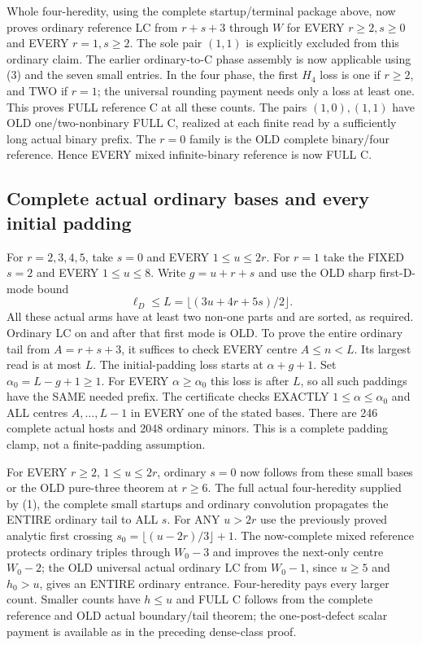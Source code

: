 Whole four-heredity, using the complete startup/terminal package
above, now proves ordinary reference LC from $r+s+3$ through
$W$ for EVERY $r\ge2,s\ge0$ and EVERY $r=1,s\ge2$.
The sole pair $(1,1)$ is explicitly excluded from this ordinary
claim. The earlier ordinary-to-C phase assembly is now applicable
using (3) and the seven small entries. In the four phase, the
first $H_4$ loss is one if $r\ge2$, and TWO if $r=1$;
the universal rounding payment needs only a loss at least one.
This proves FULL reference C at all these counts. The pairs
$(1,0),(1,1)$ have OLD one/two-nonbinary FULL C, realized at
each finite read by a sufficiently long actual binary prefix.
The $r=0$ family is the OLD complete binary/four reference.
Hence EVERY mixed infinite-binary reference is now FULL C.

\subsection{Complete actual ordinary bases and every initial padding}
For $r=2,3,4,5$, take $s=0$ and EVERY $1\le u\le2r$.
For $r=1$ take the FIXED $s=2$ and EVERY $1\le u\le8$.
Write $g=u+r+s$ and use the OLD sharp first-D-mode bound
\[
          \ell_D\le L=\lfloor(3u+4r+5s)/2\rfloor .
\]
All these actual arms have at least two non-one parts and are
sorted, as required. Ordinary LC on and after that first mode
is OLD. To prove the entire ordinary tail from $A=r+s+3$, it
suffices to check EVERY centre $A\le n<L$.
Its largest read is at most $L$.
The initial-padding loss starts at $\alpha+g+1$. Set
$\alpha_0=L-g+1\ge1$. For EVERY $\alpha\ge\alpha_0$ this
loss is after $L$, so all such paddings have the SAME needed prefix.
The certificate checks EXACTLY $1\le\alpha\le\alpha_0$ and
ALL centres $A,\ldots,L-1$ in EVERY one of the stated bases.
There are 246 complete actual hosts and 2048 ordinary minors.
This is a complete padding clamp, not a finite-padding assumption.

For EVERY $r\ge2$, $1\le u\le2r$, ordinary $s=0$ now follows
from these small bases or the OLD pure-three theorem at $r\ge6$.
The full actual four-heredity supplied by (1), the complete small
startups and ordinary convolution propagates the ENTIRE ordinary
tail to ALL $s$. For ANY $u>2r$ use the previously proved analytic
first crossing $s_0=\lfloor(u-2r)/3\rfloor+1$.
The now-complete mixed reference protects ordinary triples
through $W_0-3$ and improves the next-only centre $W_0-2$;
the OLD universal actual ordinary LC from $W_0-1$, since
$u\ge5$ and $h_0>u$, gives an ENTIRE ordinary entrance.
Four-heredity pays every larger count. Smaller counts have
$h\le u$ and FULL C follows from the complete reference and
OLD actual boundary/tail theorem; the one-post-defect scalar
payment is available as in the preceding dense-class proof.

